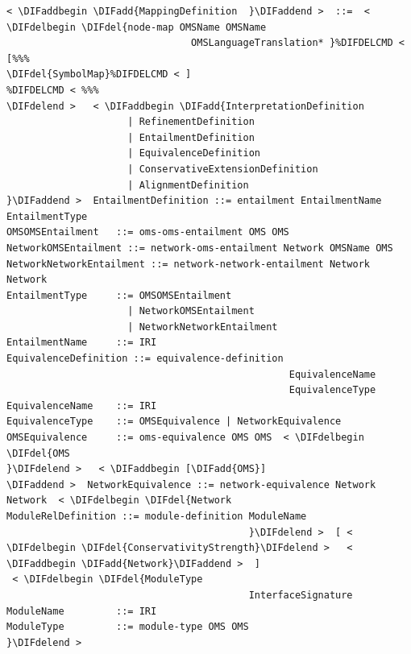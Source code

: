 \documentclass[10pt,fleqn,final]{scrreprt}
\newenvironment{definitions}[0]{\medskip }{}
\providecommand{\DIFadd}[1]{{\protect\color{blue}\uwave{#1}}} %
\providecommand{\DIFdel}[1]{{\protect\color{red}\sout{#1}}}                      %
\providecommand{\DIFaddbegin}{} %
\providecommand{\DIFaddend}{} %
\providecommand{\DIFdelbegin}{} %
\providecommand{\DIFdelend}{} %
\begin{document}
\begin{definitions}
\begin{lstlisting}[language=ebnf,escapeinside={<>},mathescape]  %DIF >  abstract syntax
< \DIFaddbegin \DIFadd{MappingDefinition  }\DIFaddend >  ::=  < \DIFdelbegin \DIFdel{node-map OMSName OMSName
                                OMSLanguageTranslation* }%DIFDELCMD < [%%%
\DIFdel{SymbolMap}%DIFDELCMD < ]
%DIFDELCMD < %%%
\DIFdelend >   < \DIFaddbegin \DIFadd{InterpretationDefinition
                     | RefinementDefinition
                     | EntailmentDefinition
                     | EquivalenceDefinition
                     | ConservativeExtensionDefinition
                     | AlignmentDefinition
}\DIFaddend >  EntailmentDefinition ::= entailment EntailmentName EntailmentType
OMSOMSEntailment   ::= oms-oms-entailment OMS OMS
NetworkOMSEntailment ::= network-oms-entailment Network OMSName OMS
NetworkNetworkEntailment ::= network-network-entailment Network Network
EntailmentType     ::= OMSOMSEntailment
                     | NetworkOMSEntailment
                     | NetworkNetworkEntailment
EntailmentName     ::= IRI
EquivalenceDefinition ::= equivalence-definition
                                                 EquivalenceName
                                                 EquivalenceType
EquivalenceName    ::= IRI
EquivalenceType    ::= OMSEquivalence | NetworkEquivalence
OMSEquivalence     ::= oms-equivalence OMS OMS  < \DIFdelbegin \DIFdel{OMS
}\DIFdelend >   < \DIFaddbegin [\DIFadd{OMS}]
\DIFaddend >  NetworkEquivalence ::= network-equivalence Network Network  < \DIFdelbegin \DIFdel{Network
ModuleRelDefinition ::= module-definition ModuleName
                                          }\DIFdelend >  [ < \DIFdelbegin \DIFdel{ConservativityStrength}\DIFdelend >   < \DIFaddbegin \DIFadd{Network}\DIFaddend >  ]
 < \DIFdelbegin \DIFdel{ModuleType
                                          InterfaceSignature
ModuleName         ::= IRI
ModuleType         ::= module-type OMS OMS
}\DIFdelend > \end{lstlisting}


\end{definitions}
\end{document}
